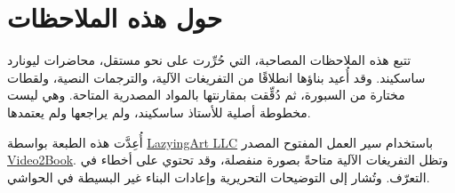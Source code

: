 \documentclass[11pt,oneside]{book}
\begin{document}
\frontmatter
\hypersetup{pageanchor=false}

\hypersetup{pageanchor=true}

\clearpage
\chapter*{حول هذه الملاحظات}
تتبع هذه الملاحظات المصاحبة، التي حُرِّرت على نحو مستقل، محاضرات ليونارد ساسكيند. وقد أُعيد بناؤها انطلاقًا من التفريغات الآلية، والترجمات النصية، ولقطات مختارة من السبورة، ثم دُقِّقت بمقارنتها بالمواد المصدرية المتاحة. وهي ليست مخطوطة أصلية للأستاذ ساسكيند، ولم يراجعها ولم يعتمدها.

أُعِدَّت هذه الطبعة بواسطة \href{https://lazying.art}{LazyingArt LLC} باستخدام سير العمل المفتوح المصدر \href{https://github.com/lachlanchen/Video2Book}{Video2Book}. وتظل التفريغات الآلية متاحةً بصورة منفصلة، وقد تحتوي على أخطاء في التعرّف. وتُشار إلى التوضيحات التحريرية وإعادات البناء غير البسيطة في الحواشي.
\clearpage
\tableofcontents
\mainmatter










\end{document}
